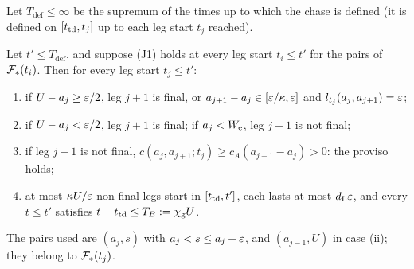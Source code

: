 \medskip
Let $T_{\mathrm{def}}\le\infty$ be the supremum of the times up to which the chase is defined (it is defined on $[t_{\mathrm{td}},t_j]$ up to
each leg start $t_j$ reached).

\begin{lemma}[Legs]\label{lem:legs}
Let $t'\le T_{\mathrm{def}}$, and suppose \textup{(J1)} holds at every leg start $t_i\le t'$ for the pairs of $\mathcal F_*(t_i)$. Then for
every leg start $t_j\le t'$:
\begin{enumerate}
\item[(i)] if $U-a_j\ge\varepsilon/2$, leg $j+1$ is final, or $a_{j+1}-a_j\in[\varepsilon/\kappa,\varepsilon]$ and $l_{t_j}(a_j,a_{j+1})=\varepsilon$;
\item[(ii)] if $U-a_j<\varepsilon/2$, leg $j+1$ is final; if $a_j<W_{\mathrm e}$, leg $j+1$ is not final;
\item[(iii)] if leg $j+1$ is not final, $c(a_j,a_{j+1};t_j)\ge c_A(a_{j+1}-a_j)>0$: the proviso holds;
\item[(iv)] at most $\kappa U/\varepsilon$ non-final legs start in $[t_{\mathrm{td}},t']$, each lasts at most $d_{\mathrm L}\varepsilon$, and every $t\le t'$ satisfies
$t-t_{\mathrm{td}}\le T_B:=\chi_{\mathrm g} U$.
\end{enumerate}
The pairs used are $(a_j,s)$ with $a_j<s\le a_j+\varepsilon$, and $(a_{j-1},U)$ in case \textup{(ii)}; they belong to $\mathcal F_*(t_j)$.
\end{lemma}


